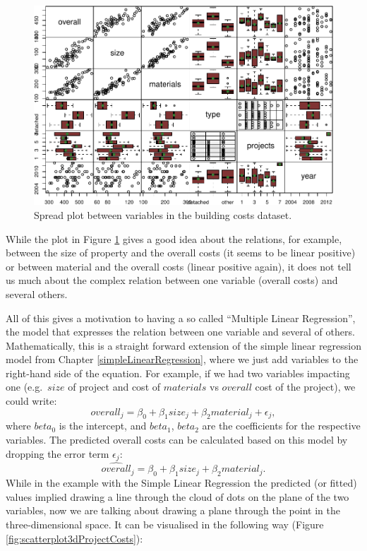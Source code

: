 \documentclass[
]{book}
\theoremstyle{definition}
\theoremstyle{definition}
\theoremstyle{definition}
\theoremstyle{definition}
\theoremstyle{remark}
\begin{document}
\begin{figure}
\centering
\includegraphics{Svetunkov---Statistics-for-Business-Analytics_files/figure-latex/CostsSpread-1.pdf}
\caption{\label{fig:CostsSpread}Spread plot between variables in the building costs dataset.}
\end{figure}

While the plot in Figure \ref{fig:CostsSpread} gives a good idea about the relations, for example, between the size of property and the overall costs (it seems to be linear positive) or between material and the overall costs (linear positive again), it does not tell us much about the complex relation between one variable (overall costs) and several others.

All of this gives a motivation to having a so called ``Multiple Linear Regression'', the model that expresses the relation between one variable and several of others. Mathematically, this is a straight forward extension of the simple linear regression model from Chapter \ref{simpleLinearRegression}, where we just add variables to the right-hand side of the equation. For example, if we had two variables impacting one (e.g.~\(size\) of project and cost of \(materials\) vs \(overall\) cost of the project), we could write:
\begin{equation}
    overall_j = \beta_0 + \beta_1 size_{j} + \beta_2 material_{j} + \epsilon_j ,
    \label{eq:MLRFormulaExample}
\end{equation}
where \(beta_0\) is the intercept, and \(beta_1\), \(beta_2\) are the coefficients for the respective variables. The predicted overall costs can be calculated based on this model by dropping the error term \(\epsilon_j\):
\begin{equation*}
    \widehat{overall}_j = \beta_0 + \beta_1 size_{j} + \beta_2 material_{j}.
\end{equation*}
While in the example with the Simple Linear Regression the predicted (or fitted) values implied drawing a line through the cloud of dots on the plane of the two variables, now we are talking about drawing a plane through the point in the three-dimensional space. It can be visualised in the following way (Figure \ref{fig:scatterplot3dProjectCosts}):
\end{document}
